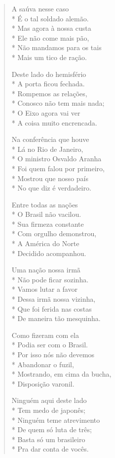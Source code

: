 \begin{verse}
A saúva nesse caso\\*
É o tal soldado alemão.\\*
Mas agora à nossa custa\\*
Ele não come mais pão,\\*
Não mandamos para os tais\\*
Mais um tico de ração.

Deste lado do hemisfério\\*
A porta ficou fechada.\\*
Rompemos as relações,\\*
Conosco não tem mais nada;\\*
O Eixo agora vai ver\\*
A coisa muito encrencada.

Na conferência que houve\\*
Lá no Rio de Janeiro,\\*
O ministro Osvaldo Aranha\\*
Foi quem falou por primeiro,\\*
Mostrou que nosso país\\*
No que diz é verdadeiro.

Entre todas as nações\\*
O Brasil não vacilou.\\*
Sua firmeza constante\\*
Com orgulho demonstrou,\\*
A América do Norte\\*
Decidido acompanhou.

Uma nação nossa irmã\\*
Não pode ficar sozinha.\\*
Vamos lutar a favor\\*
Dessa irmã nossa vizinha,\\*
Que foi ferida nas costas\\*
De maneira tão mesquinha.

Como fizeram com ela\\*
Podia ser com o Brasil.\\*
Por isso nós não devemos\\*
Abandonar o fuzil,\\*
Mostrando, em cima da bucha,\\*
Disposição varonil.

Ninguém aqui deste lado\\*
Tem medo de japonês;\\*
Ninguém teme atrevimento\\*
De quem só luta de três;\\*
Basta só um brasileiro\\*
Pra dar conta de vocês.


\end{verse}
